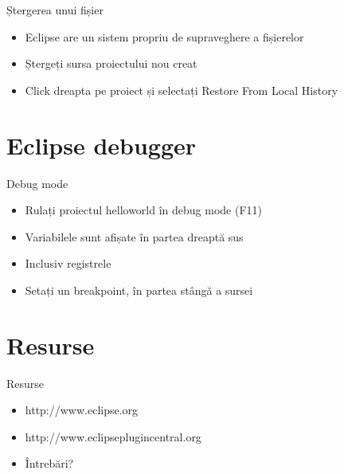 \documentclass{beamer}
\begin{document}
\begin{frame}{Ștergerea unui fișier}
  \begin{itemize}
  \item Eclipse are un sistem propriu de supraveghere a fișierelor
  \pause
  \item Ștergeți sursa proiectului nou creat
  \pause
  \item Click dreapta pe proiect și selectați Restore From Local History
  \end{itemize}
\end{frame}

\section{Eclipse debugger}

\begin{frame}{Debug mode}
  \begin{itemize}
  \item Rulați proiectul helloworld în debug mode (F11) 
  \pause
  \item Variabilele sunt afișate în partea dreaptă sus
  \pause
  \item Inclusiv registrele 
  \pause
  \item Setați un breakpoint, în partea stângă a sursei 
  \end{itemize}
\end{frame}

\section{Resurse}

\begin{frame}{Resurse}
  \begin{itemize}
  \item http://www.eclipse.org
  \pause
  \item http://www.eclipseplugincentral.org  
  \pause
  \vspace{10mm}
  \item Întrebări?
  \end{itemize}
\end{frame}

\begin{frame}{}
\end{frame}
\end{document}
